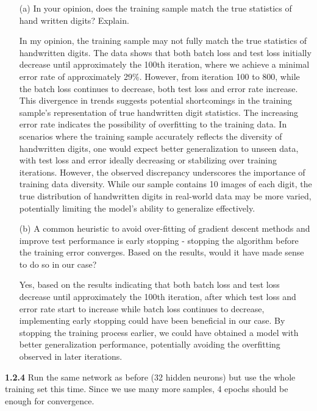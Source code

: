 \documentclass[a4paper, 12pt]{article}
\begin{document}
\begin{itemize}
    \item[(a)] \textcolor{myblue}{In your opinion, does the training sample match the true statistics of hand written digits?
    Explain.}
    \item[] 
        In my opinion, the training sample may not fully match the true statistics of handwritten digits. 
        The data shows that both batch loss and test loss initially decrease until approximately the 100th iteration,
        where we achieve a minimal error rate of approximately 29\%. 
        However, from iteration 100 to 800, while the batch loss continues to decrease, 
        both test loss and error rate increase. 
        This divergence in trends suggests potential shortcomings in the training sample's representation 
        of true handwritten digit statistics. The increasing error rate indicates the possibility of 
        overfitting to the training data. 
        In scenarios where the training sample accurately reflects the diversity of handwritten digits, 
        one would expect better generalization to unseen data, with test loss and error ideally 
        decreasing or stabilizing over training iterations. 
        However, the observed discrepancy underscores the importance of training data diversity. 
        While our sample contains 10 images of each digit, the true distribution of handwritten 
        digits in real-world data may be more varied, potentially limiting the model's ability to generalize effectively.

    \item[(b)] \textcolor{myblue}{A common heuristic to avoid over-fitting of gradient descent methods and improve test
    performance is early stopping - stopping the algorithm before the training error converges. Based on the results, would it have made sense to do so in our case?}
    \item[] 
    Yes, based on the results indicating that both batch loss and test loss decrease until approximately the 100th 
    iteration, after which test loss and error rate start to increase while batch loss continues to decrease, 
    implementing early stopping could have been beneficial in our case. 
    By stopping the training process earlier, we could have obtained a model with 
    better generalization performance, potentially avoiding the overfitting observed in later iterations.

\end{itemize}

\bigskip
\textcolor{myblue}{
\textbf{1.2.4} Run the same network as before (32 hidden neurons) but use the whole training set this time.
Since we use many more samples, 4 epochs should be enough for convergence.  
}
\end{document}
